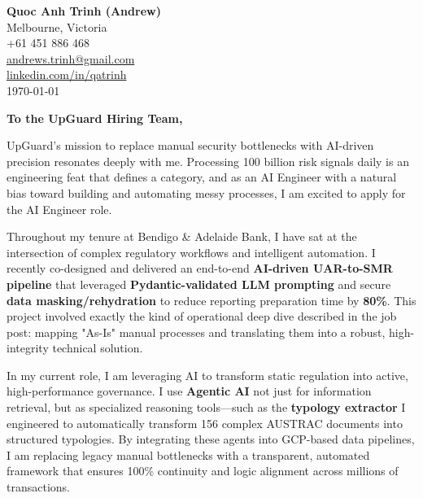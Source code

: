 \documentclass[11pt, a4paper]{article}
\begin{document}
\begin{flushleft}
\textbf{Quoc Anh Trinh (Andrew)} \\
Melbourne, Victoria \\
+61 451 886 468 \\
\href{mailto:andrews.trinh@gmail.com}{andrews.trinh@gmail.com} \\
\href{https://www.linkedin.com/in/qatrinh/}{linkedin.com/in/qatrinh} \\
\vspace{1em}
\today
\end{flushleft}

\vspace{1em}

\begin{flushleft}
\textbf{To the UpGuard Hiring Team,}
\end{flushleft}

\vspace{1em}

UpGuard’s mission to replace manual security bottlenecks with AI-driven precision resonates deeply with me. Processing 100 billion risk signals daily is an engineering feat that defines a category, and as an AI Engineer with a natural bias toward building and automating messy processes, I am excited to apply for the AI Engineer role.

Throughout my tenure at Bendigo \& Adelaide Bank, I have sat at the intersection of complex regulatory workflows and intelligent automation. I recently co-designed and delivered an end-to-end \textbf{AI-driven UAR-to-SMR pipeline} that leveraged \textbf{Pydantic-validated LLM prompting} and secure \textbf{data masking/rehydration} to reduce reporting preparation time by \textbf{80\%}. This project involved exactly the kind of operational deep dive described in the job post: mapping "As-Is" manual processes and translating them into a robust, high-integrity technical solution.

In my current role, I am leveraging AI to transform static regulation into active, high-performance governance. I use \textbf{Agentic AI} not just for information retrieval, but as specialized reasoning tools—such as the \textbf{typology extractor} I engineered to automatically transform 156 complex AUSTRAC documents into structured typologies. By integrating these agents into GCP-based data pipelines, I am replacing legacy manual bottlenecks with a transparent, automated framework that ensures 100\% continuity and logic alignment across millions of transactions.
\end{document}
